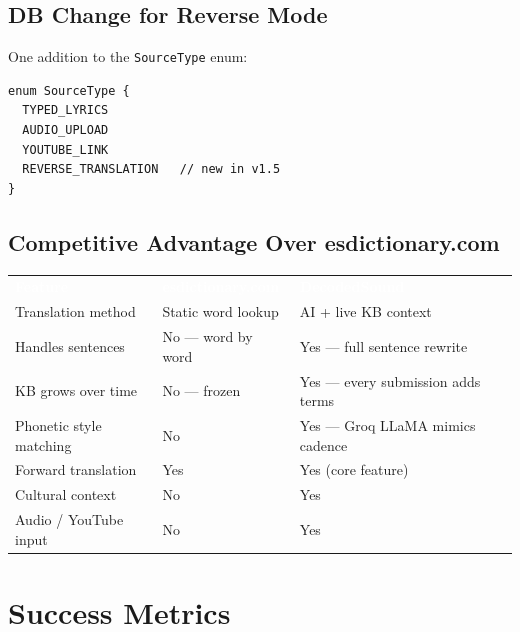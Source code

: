 \documentclass[12pt, a4paper]{article}
\begin{document}
\subsection{DB Change for Reverse Mode}

One addition to the \texttt{SourceType} enum:

\begin{tcolorbox}[codebox]
\begin{lstlisting}
enum SourceType {
  TYPED_LYRICS
  AUDIO_UPLOAD
  YOUTUBE_LINK
  REVERSE_TRANSLATION   // new in v1.5
}
\end{lstlisting}
\end{tcolorbox}

\subsection{Competitive Advantage Over esdictionary.com}

\renewcommand{\arraystretch}{1.5}
\begin{center}
\begin{tabular}{L{4.5cm} L{4cm} L{5cm}}
  \textcolor{white}{\textbf{Feature}} &
  \textcolor{white}{\textbf{esdictionary.com}} &
  \textcolor{white}{\textbf{DecodedSound}} \\
  Translation method & Static word lookup & AI + live KB context \\
  Handles sentences & No — word by word & Yes — full sentence rewrite \\
  KB grows over time & No — frozen & Yes — every submission adds terms \\
  Phonetic style matching & No & Yes — Groq LLaMA mimics cadence \\
  Forward translation & Yes & Yes (core feature) \\
  Cultural context & No & Yes \\
  Audio / YouTube input & No & Yes \\
\end{tabular}
\end{center}

\section{Success Metrics}
\end{document}
